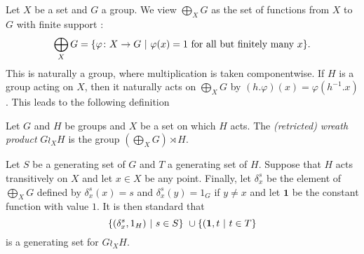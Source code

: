 Let $X$ be a set and $G$ a group. We view 
$\bigoplus_XG$ as the set of functions from $X$ to $G$ with finite support :
\[
\bigoplus_XG=\{\varphi\colon X\to G\ |\ \varphi(x)=1 \textnormal{ for all but finitely many }x\}.\]
This is naturally a group, where multiplication is taken componentwise.
If $H$ is a group acting on $X$, then it naturally acts on $\bigoplus_XG$
by $(h.\varphi)(x)=\varphi(h^{-1}.x)$.
This leads to the following definition
\begin{defn}
Let $G$ and $H$ be groups and $X$ be a set on which $H$ acts.
The \emph{(retricted) wreath product} $G\wr_XH$ is the group $(\bigoplus_XG)\rtimes H$.
\end{defn}
Let $S$ be a generating set of $G$ and $T$ a generating set of $H$.
Suppose that $H$ acts transitively on $X$ and let $x\in X$ be any point.
Finally, let $\delta_x^s$ be the element of $\bigoplus_XG$ defined by $\delta_x^s(x)=s$ and $\delta_x^s(y)=1_G$ if $y\neq x$ and let $\mathbf 1$ be the constant function with value $1$.
It is then standard that 
\[\setst{(\delta_x^s,1_H)}{s \in S} \cup \setst{(\mathbf 1,t}{t \in T}\]
is a generating set for $G\wr_XH$.

